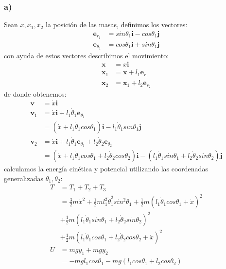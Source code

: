 \documentclass{article}
\begin{document}
\begin{tcolorbox}[breakable]
    \subsubsection*{a)}
    Sean $x,x_1,x_2$ la posición de las masas, definimos los vectores:
    \begin{align*}
        \bm{e}_{r_1} &= sin\theta_1\bm{i} - cos\theta_1\bm{j} \\
        \bm{e}_{\theta_1} &= cos\theta_1\bm{i} + sin\theta_1\bm{j} 
    \end{align*}
    con ayuda de estos vectores describimos el movimiento:
    \begin{align*}
        \bm{x} &= x\bm{i} \\
        \bm{x}_1 &= \bm{x} + l_1\bm{e}_{r_1} \\
        \bm{x}_2 &= \bm{x}_1 + l_2\bm{e}_{r_2} 
    \end{align*}
    de donde obtenemos:
    \begin{align*}
        \bm{v}
        &= \dot{x}\bm{i} \\
        \bm{v}_1 
        &= \dot{x}\bm{i} + l_1\dot{\theta}_1\bm{e}_{\theta_1} \\
        &= (\dot{x} + l_1\dot{\theta}_1cos\theta_1 )\bm{i} - l_1\dot{\theta}_1sin\theta_1 \bm{j} \\
        \bm{v}_2 
        &= \dot{x}\bm{i} + l_1\dot{\theta}_1\bm{e}_{\theta_1} + l_2\dot{\theta}_2\bm{e}_{\theta_2} \\
        &= (\dot{x} + l_1\dot{\theta}_1cos\theta_1 + l_2\dot{\theta}_2cos\theta_2)\bm{i} - (l_1\dot{\theta}_1sin\theta_1 + l_2\dot{\theta}_2sin\theta_2) \bm{j} 
    \end{align*}
    calculamos la energía cinética y potencial utilizando las coordenadas generalizadas $\theta_1,\theta_2$:
    \begin{align*}
        T 
        &= T_1 + T_2 + T_3 \\
        &= \frac{3}{2}m\dot{x}^2 + \frac{1}{2}ml_1^2\dot{\theta}_1^2sin^2\theta_1 + \frac{1}{2}m(l_1 \dot{\theta}_1 cos\theta_1 + \dot{x})^2 \\
        &+ \frac{1}{2}m(l_1\dot{\theta}_1 sin\theta_1 + l_2\dot{\theta}_2 sin\theta_2)^2 \\
        &+ \frac{1}{2}m(l_1\dot{\theta}_1cos\theta_1 + l_2\dot{\theta}_2 cos\theta_2 + \dot{x})^2 \\
        U
        &= mgy_1 + mgy_2 \\
        &= -mgl_1cos\theta_1 - mg(l_1cos\theta_1 + l_2cos\theta_2) \\

\end{align*}
\end{tcolorbox}
\end{document}
